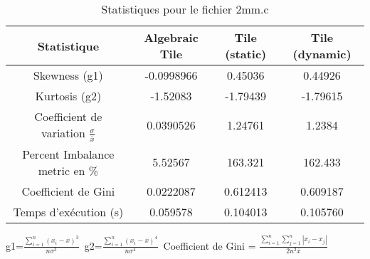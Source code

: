 \documentclass{article}
\begin{document}
\begin{table}[htbp]
  \centering
  \caption{Statistiques pour le fichier 2mm.c}
  \begin{tabular}{|c|c|c|c|}
    \hline
    Statistique & Algebraic Tile & Tile (static) & Tile (dynamic) \\ 
    \hline
    Skewness (g1)  & -0.0998966 & 0.45036 & 0.44926 \\ 
    Kurtosis (g2)  & -1.52083 & -1.79439 & -1.79615 \\ 
    Coefficient de variation $ \frac{\sigma}{\overline{x}} $ & 0.0390526 & 1.24761 & 1.2384\\ 
    Percent Imbalance metric en \% & 5.52567 & 163.321 & 162.433\\ 
    Coefficient de Gini  & 0.0222087 & 0.612413 & 0.609187\\ 
    Temps d'exécution (s) &  0.059578    &  0.104013   &  0.105760   \\ 

    \hline
  \end{tabular}
\end{table}
g1=$ \frac{\sum_{i=1}^{n} (x_i - \overline{x})^3}{n\sigma^3} $\
g2=$ \frac{\sum_{i=1}^{n} (x_i - \overline{x})^4}{n\sigma^4} $\
Coefficient de Gini = $ \frac{\sum_{i=1}^{n}\sum_{j=1}^{n} |x_i - x_j|}{2n^2\overline{x}} $\
\newpage
\end{document}
